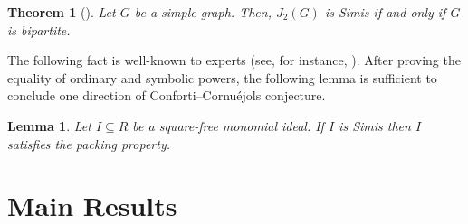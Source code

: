 \documentclass[12pt]{amsart}
\newtheorem{lemma}[proposition]{Lemma}
\newtheorem{theorem}[proposition]{Theorem}
\begin{document}
\begin{theorem}[{\cite[see Corollary 3.17, Theorem 4.6, Proposition 4.27]{2009Gitler-et.al}}]\label{thm:simis-coverideals-of-edgeideals}
    Let $G$ be a simple graph. Then, $J_2(G)$ is Simis if and only if $G$ is bipartite.
\end{theorem}

The following fact is well-known to experts (see, for instance, \cite{2015Dao-et.el}). After proving the equality of ordinary and symbolic powers, the following lemma is sufficient to conclude one direction of Conforti--Cornu\'{e}jols conjecture.

\begin{lemma}\label{lem: Simis implies packed}
    Let $I\subseteq R$ be a square-free monomial ideal. If $I$ is Simis then $I$ satisfies the packing property. 
\end{lemma}


\section{Main Results}\label{sec: main}
\end{document}
